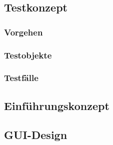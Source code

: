 \subsection{Testkonzept} \label{testkonzept}
\subsubsection{Vorgehen}
\subsubsection{Testobjekte}
\subsubsection{Testfälle}
\subsection{Einführungskonzept}
\subsection{GUI-Design}